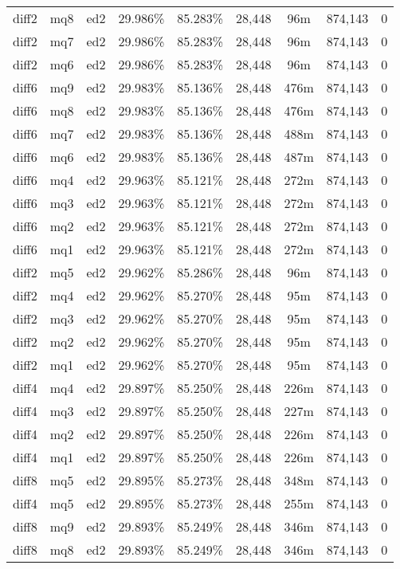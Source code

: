 \begin{landscape}
\begin{longtable}{|c|c|c||c|c||c|c|c|c|}
diff2 & mq8 & ed2 & 29.986\% & 85.283\% & 28,448 & 96m & 874,143 & 0 \\
diff2 & mq7 & ed2 & 29.986\% & 85.283\% & 28,448 & 96m & 874,143 & 0 \\
diff2 & mq6 & ed2 & 29.986\% & 85.283\% & 28,448 & 96m & 874,143 & 0 \\
diff6 & mq9 & ed2 & 29.983\% & 85.136\% & 28,448 & 476m & 874,143 & 0 \\
diff6 & mq8 & ed2 & 29.983\% & 85.136\% & 28,448 & 476m & 874,143 & 0 \\
diff6 & mq7 & ed2 & 29.983\% & 85.136\% & 28,448 & 488m & 874,143 & 0 \\
diff6 & mq6 & ed2 & 29.983\% & 85.136\% & 28,448 & 487m & 874,143 & 0 \\
diff6 & mq4 & ed2 & 29.963\% & 85.121\% & 28,448 & 272m & 874,143 & 0 \\
diff6 & mq3 & ed2 & 29.963\% & 85.121\% & 28,448 & 272m & 874,143 & 0 \\
diff6 & mq2 & ed2 & 29.963\% & 85.121\% & 28,448 & 272m & 874,143 & 0 \\
diff6 & mq1 & ed2 & 29.963\% & 85.121\% & 28,448 & 272m & 874,143 & 0 \\
diff2 & mq5 & ed2 & 29.962\% & 85.286\% & 28,448 & 96m & 874,143 & 0 \\
diff2 & mq4 & ed2 & 29.962\% & 85.270\% & 28,448 & 95m & 874,143 & 0 \\
diff2 & mq3 & ed2 & 29.962\% & 85.270\% & 28,448 & 95m & 874,143 & 0 \\
diff2 & mq2 & ed2 & 29.962\% & 85.270\% & 28,448 & 95m & 874,143 & 0 \\
diff2 & mq1 & ed2 & 29.962\% & 85.270\% & 28,448 & 95m & 874,143 & 0 \\
diff4 & mq4 & ed2 & 29.897\% & 85.250\% & 28,448 & 226m & 874,143 & 0 \\
diff4 & mq3 & ed2 & 29.897\% & 85.250\% & 28,448 & 227m & 874,143 & 0 \\
diff4 & mq2 & ed2 & 29.897\% & 85.250\% & 28,448 & 226m & 874,143 & 0 \\
diff4 & mq1 & ed2 & 29.897\% & 85.250\% & 28,448 & 226m & 874,143 & 0 \\
diff8 & mq5 & ed2 & 29.895\% & 85.273\% & 28,448 & 348m & 874,143 & 0 \\
diff4 & mq5 & ed2 & 29.895\% & 85.273\% & 28,448 & 255m & 874,143 & 0 \\
diff8 & mq9 & ed2 & 29.893\% & 85.249\% & 28,448 & 346m & 874,143 & 0 \\
diff8 & mq8 & ed2 & 29.893\% & 85.249\% & 28,448 & 346m & 874,143 & 0 \\

\end{longtable}
\end{landscape}
